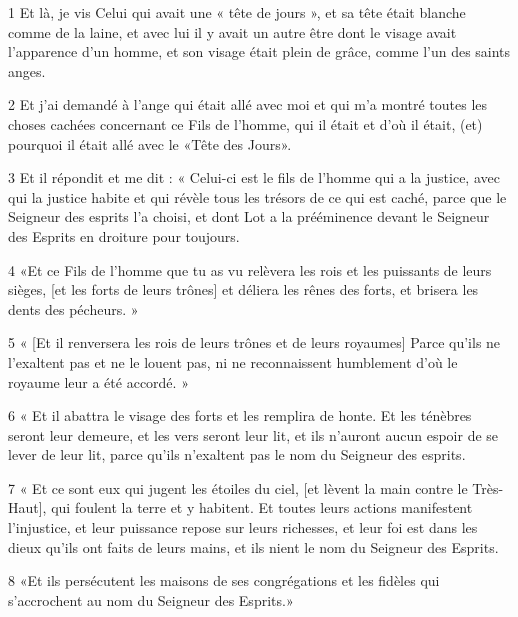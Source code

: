 \par 1 Et là, je vis Celui qui avait une « tête de jours », et sa tête était blanche comme de la laine, et avec lui il y avait un autre être dont le visage avait l'apparence d'un homme, et son visage était plein de grâce, comme l'un des saints anges.
\par 2 Et j'ai demandé à l'ange qui était allé avec moi et qui m'a montré toutes les choses cachées concernant ce Fils de l'homme, qui il était et d'où il était, (et) pourquoi il était allé avec le «Tête des Jours».
\par 3 Et il répondit et me dit : « Celui-ci est le fils de l'homme qui a la justice, avec qui la justice habite et qui révèle tous les trésors de ce qui est caché, parce que le Seigneur des esprits l'a choisi, et dont Lot a la prééminence devant le Seigneur des Esprits en droiture pour toujours.
\par 4 «Et ce Fils de l'homme que tu as vu relèvera les rois et les puissants de leurs sièges, [et les forts de leurs trônes] et déliera les rênes des forts, et brisera les dents des pécheurs. »
\par 5 « [Et il renversera les rois de leurs trônes et de leurs royaumes] Parce qu'ils ne l'exaltent pas et ne le louent pas, ni ne reconnaissent humblement d'où le royaume leur a été accordé. »
\par 6 « Et il abattra le visage des forts et les remplira de honte. Et les ténèbres seront leur demeure, et les vers seront leur lit, et ils n'auront aucun espoir de se lever de leur lit, parce qu'ils n'exaltent pas le nom du Seigneur des esprits.
\par 7 « Et ce sont eux qui jugent les étoiles du ciel, [et lèvent la main contre le Très-Haut], qui foulent la terre et y habitent. Et toutes leurs actions manifestent l'injustice, et leur puissance repose sur leurs richesses, et leur foi est dans les dieux qu'ils ont faits de leurs mains, et ils nient le nom du Seigneur des Esprits.
\par 8 «Et ils persécutent les maisons de ses congrégations et les fidèles qui s'accrochent au nom du Seigneur des Esprits.»


